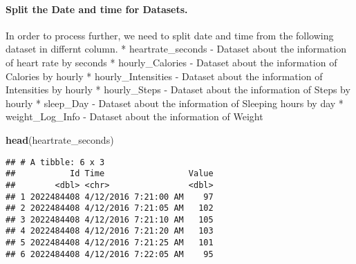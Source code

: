 \documentclass[
]{article}
\newenvironment{Shaded}{\begin{snugshade}}{\end{snugshade}}
\newcommand{\FunctionTok}[1]{\textcolor[rgb]{0.13,0.29,0.53}{\textbf{#1}}}
\newcommand{\NormalTok}[1]{#1}
\begin{document}
\paragraph{Split the Date and time for
Datasets.}\label{split-the-date-and-time-for-datasets.}

In order to process further, we need to split date and time from the
following dataset in differnt column. * heartrate\_seconds - Dataset
about the information of heart rate by seconds * hourly\_Calories -
Dataset about the information of Calories by hourly *
hourly\_Intensities - Dataset about the information of Intensities by
hourly * hourly\_Steps - Dataset about the information of Steps by
hourly * sleep\_Day - Dataset about the information of Sleeping hours by
day * weight\_Log\_Info - Dataset about the information of Weight

\begin{Shaded}
\begin{Highlighting}[]
\FunctionTok{head}\NormalTok{(heartrate\_seconds)}
\end{Highlighting}
\end{Shaded}

\begin{verbatim}
## # A tibble: 6 x 3
##           Id Time                 Value
##        <dbl> <chr>                <dbl>
## 1 2022484408 4/12/2016 7:21:00 AM    97
## 2 2022484408 4/12/2016 7:21:05 AM   102
## 3 2022484408 4/12/2016 7:21:10 AM   105
## 4 2022484408 4/12/2016 7:21:20 AM   103
## 5 2022484408 4/12/2016 7:21:25 AM   101
## 6 2022484408 4/12/2016 7:22:05 AM    95
\end{verbatim}
\end{document}

